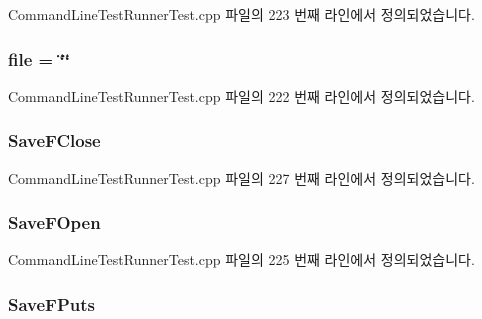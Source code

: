 Command\+Line\+Test\+Runner\+Test.\+cpp 파일의 223 번째 라인에서 정의되었습니다.

\subsubsection[{\texorpdfstring{file}{file}}]{ file = \char`\"{}\char`\"{}\hspace{0.3cm}{\ttfamily [static]}}\hypertarget{struct_fake_output_a8fa12252d975e05c9fd1f95616eaec1d}{}\label{struct_fake_output_a8fa12252d975e05c9fd1f95616eaec1d}


Command\+Line\+Test\+Runner\+Test.\+cpp 파일의 222 번째 라인에서 정의되었습니다.

\subsubsection[{\texorpdfstring{Save\+F\+Close}{SaveFClose}}]{ Save\+F\+Close\hspace{0.3cm}{\ttfamily [private]}}\hypertarget{struct_fake_output_a133ec4c951d2f641022289f3641acdc9}{}\label{struct_fake_output_a133ec4c951d2f641022289f3641acdc9}


Command\+Line\+Test\+Runner\+Test.\+cpp 파일의 227 번째 라인에서 정의되었습니다.

\subsubsection[{\texorpdfstring{Save\+F\+Open}{SaveFOpen}}]{ Save\+F\+Open\hspace{0.3cm}{\ttfamily [private]}}\hypertarget{struct_fake_output_a0c39f7dcad1913f04f7e02de6e62f96f}{}\label{struct_fake_output_a0c39f7dcad1913f04f7e02de6e62f96f}


Command\+Line\+Test\+Runner\+Test.\+cpp 파일의 225 번째 라인에서 정의되었습니다.

\subsubsection[{\texorpdfstring{Save\+F\+Puts}{SaveFPuts}}]{ Save\+F\+Puts\hspace{0.3cm}{\ttfamily [private]}}\hypertarget{struct_fake_output_a9da20fa712f95cad317ca6f34d8ae6e8}{}\label{struct_fake_output_a9da20fa712f95cad317ca6f34d8ae6e8}


